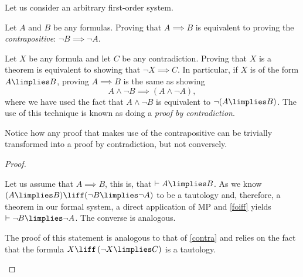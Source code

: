 \begin{theorem}
Let us consider an arbitrary first-order system.
\begin{statements}
\item Let $A$ and $B$ be any formulas. Proving that $A\implies B$ is equivalent to proving the \emph{contrapositive}: $\lnot B \implies \lnot A$. \label{contra}
\item Let $X$ be any formula and let $C$ be any contradiction.
Proving that $X$ is a theorem is equivalent to showing that $\lnot X \implies C$. In particular, if $X$ is of the form $A \limplies B$, proving $A \implies B$ is the same as showing
\[A \land \lnot B \implies (A \land \lnot A),\]
where we have used the fact that $A \land \lnot B$ is equivalent to $\lnot(A \limplies B)$. The use of this technique is known as doing a \emph{proof by contradiction}.
\end{statements}
Notice how any proof that makes use of the contrapositive can be trivially transformed into a proof by contradiction, but not conversely.
\label{pftch}
\end{theorem}

\begin{proof}
\begin{parlist}
\item Let us assume that $A \implies B$, this is, that $\vdash A \limplies B$.
As we know $(A\limplies B) \liff (\lnot B \limplies \lnot A)$ to be a tautology and, therefore, a theorem in our formal system, a direct application of MP and \ref{foiff} yields $\vdash \lnot B \limplies \lnot A$. The converse is analogous.

\item The proof of this statement is analogous to that of \ref{contra} and relies on the fact that the formula
$ X \liff \left( \lnot X \limplies C \right)$
is a tautology.
\end{parlist}
\end{proof}

